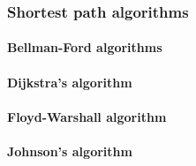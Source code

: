 \subsubsection{Shortest path algorithms}

\paragraph{Bellman-Ford algorithms}
\paragraph{Dijkstra's algorithm}
\paragraph{Floyd-Warshall algorithm}
\paragraph{Johnson's algorithm}


\newpage